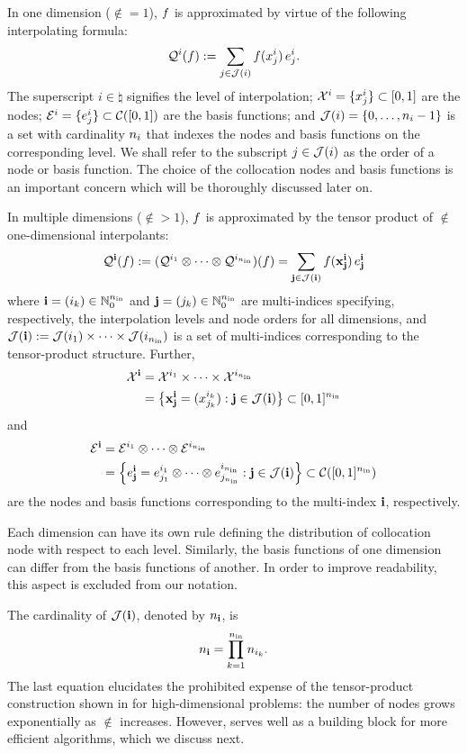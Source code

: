 In one dimension ($\nin = 1$), $f$ is approximated by virtue of the following
interpolating formula:
\begin{equation} \elab{tensor-1d}
  \tensor{i}(\f) := \sum_{j \in \index(i)} \f(\x^i_j) \, \e^i_j.
\end{equation}
The superscript $i \in \natural$ signifies the level of interpolation; $\mathcal{X}^i =
\{ x^i_j \} \subset [0, 1]$ are the nodes; $\mathcal{E}^i = \{ e^i_j \} \subset
\mathcal{C}([0, 1])$ are the basis functions; and $\mathcal{J}(i) = \{ 0, \dots, n_i
- 1 \}$ is a set with cardinality $n_i$ that indexes the nodes and basis
functions on the corresponding level. We shall refer to the subscript $j \in
\mathcal{J}(i)$ as the order of a node or basis function. The choice of the
collocation nodes and basis functions is an important concern which will be
thoroughly discussed later on.

In multiple dimensions ($\nin > 1$), $f$ is approximated by the tensor product
of $\nin$ one-dimensional interpolants:
\begin{equation} \elab{tensor}
  \tensor{\vi}(\f) := (\tensor{i_1} \otimes \cdots \otimes \tensor{i_\nin})(\f) = \sum_{\vj \in \index(\vi)} \f(\vx^\vi_\vj) \, \e^\vi_\vj
\end{equation}
where $\mathbf{i} = (i_k) \in \mathbb{N}_0^{n_\text{in}}$ and $\mathbf{j} = (j_k) \in \mathbb{N}_0^{n_\text{in}}$ are
multi-indices specifying, respectively, the interpolation levels and node orders
for all dimensions, and $\mathcal{J}(\mathbf{i}) := \mathcal{J}(i_1) \times \cdots \times
\mathcal{J}(i_{n_\text{in}})$ is a set of multi-indices corresponding to the tensor-product
structure. Further,
\begin{align}
  \X^\vi &= \X^{i_1} \times \cdots \times \X^{i_\nin} \elab{collocation-nodes} \\
         &= \left\{ \vx^\vi_\vj = (\x^{i_k}_{j_k}): \vj \in \index(\vi) \right\} \subset [0, 1]^\nin \nonumber
\end{align}
and
\begin{align}
  \E^\vi &= \E^{i_1} \otimes \cdots \otimes \E^{i_\nin} \elab{basis-functions} \\
         &= \left\{ \e^\vi_\vj = \e^{i_1}_{j_1} \otimes \cdots \otimes \e^{i_\nin}_{j_\nin}: \vj \in \index(\vi) \right\} \subset \continuous([0, 1]^\nin) \nonumber
\end{align}
are the nodes and basis functions corresponding to the multi-index $\mathbf{i}$,
respectively.
\begin{remark}
Each dimension can have its own rule defining the distribution of collocation
node with respect to each level. Similarly, the basis functions of one dimension
can differ from the basis functions of another. In order to improve readability,
this aspect is excluded from our notation.
\end{remark}
The cardinality of $\mathcal{J}(\mathbf{i})$, denoted by $n_{\mathbf{i}}$, is
\begin{equation} \elab{tensor-cardinality}
  \n_\vi = \prod_{k = 1}^\nin \n_{i_k}.
\end{equation}
The last equation elucidates the prohibited expense of the tensor-product
construction shown in  for high-dimensional problems: the number of
nodes grows exponentially as $\nin$ increases. However,  serves
well as a building block for more efficient algorithms, which we discuss next.
